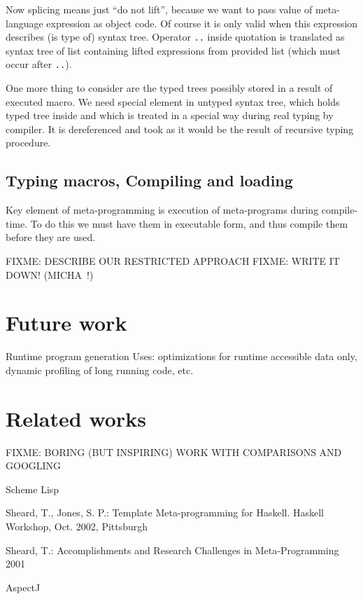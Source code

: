 \documentclass{llncs}
\begin{document}
Now splicing means just ``do not lift'', because we want to pass value of 
meta-language expression as object code. Of course it is only valid when this 
expression describes (is type of) syntax tree. Operator \verb,.., inside 
quotation is translated as syntax tree of list containing lifted expressions 
from provided list (which must occur after \verb,..,).

One more thing to consider are the typed trees possibly stored in a result
of executed macro. We need special element in untyped syntax tree, which
holds typed tree inside and which is treated in a special way during real
typing by compiler. It is dereferenced and took as it would be the result of 
recursive typing procedure. 

\subsection{Typing macros, Compiling and loading}
Key element of meta-programming is execution of meta-programs during compile-time.
To do this we must have them in executable form, and thus compile them before
they are used. 

FIXME: DESCRIBE OUR RESTRICTED APPROACH
FIXME: WRITE IT DOWN! (MICHA~!)

\section{Future work}
Runtime program generation
Uses: optimizations for runtime accessible data only,
dynamic profiling of long running code, etc.

\section{Related works}
FIXME: BORING (BUT INSPIRING) WORK WITH COMPARISONS AND GOOGLING


%
%
\begin{thebibliography}{}
%
Scheme Lisp

Sheard, T., Jones, S. P.:
Template Meta-programming for Haskell.
Haskell Workshop, Oct. 2002, Pittsburgh

Sheard, T.:
Accomplishments and Research Challenges in Meta-Programming
2001

AspectJ

\end{thebibliography}
\end{document}
